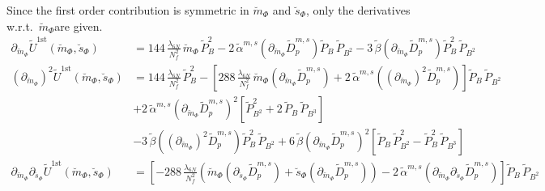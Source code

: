 Since the first order contribution is symmetric in $\breve m_{\Phi}$ and $\breve s_{\Phi}$, only the derivatives w.r.t.\ $\breve m_{\Phi}$are given. 
\begin{align}\label{eq:CEP_derivative_dm_firstOrder_rescaled}
 \partial_{\breve m_{\Phi}} \tilde U^{\text{1st}}(\breve m_{\Phi}, \breve s_{\Phi}) & = 
                           144\,\frac{\lambda_{6N}}{N_f^2}\, \breve m_{\Phi}\, \tilde P_B^2 
                         - 2\,\tilde \alpha^{m,s}\left( \partial_{\breve m_{\Phi}} \tilde D_p^{m,s} \right) \tilde P_B\, \tilde P_{B^2}
                         - 3\, \tilde \beta \left( \partial_{\breve m_{\Phi}} \tilde D_p^{m,s} \right) \tilde P_B^2\,  \tilde P_{B^2}
%                          
       \\ \label{eq:CEP_derivative_dmdm_firstOrder_rescaled}
 \left(\partial_{\breve m_{\Phi}}\right)^2 \tilde U^{\text{1st}}(\breve m_{\Phi}, \breve s_{\Phi}) & = 
                           144\,\frac{\lambda_{6N}}{N_f^2}\, \tilde P_B^2 -
                           \left[ 288\,\frac{\lambda_{6N}}{N_f^2}\,\breve m_{\Phi}\left( \partial_{\breve m_{\Phi}} \tilde D_p^{m,s} \right) 
                         + 2\,\tilde \alpha^{m,s}\left( \left(\partial_{\breve m_{\Phi}}\right)^2 \tilde D_p^{m,s} \right) \right] \tilde P_B\, \tilde P_{B^2}
       \nonumber \\
                       & + 2\,\tilde \alpha^{m,s}\left( \partial_{\breve m_{\Phi}} \tilde D_p^{m,s} \right)^2 \left[ \tilde P_{B^2}^2 + 2\, \tilde P_B\, \tilde P_{B^3} \right]
       \nonumber \\
                       & - 3\, \tilde \beta \left( \left(\partial_{\breve m_{\Phi}}\right)^2 \tilde D_p^{m,s} \right) \tilde P_B^2\,  \tilde P_{B^2}
                         + 6\, \tilde \beta \left( \partial_{\breve m_{\Phi}} \tilde D_p^{m,s} \right)^2 
                         \left[ \tilde P_B\,  \tilde P_{B^2}^2 - \tilde P_B^2\,  \tilde P_{B^3} \right]
%                          
      \\ \label{eq:CEP_derivative_dmds_firstOrder_rescaled}
 \partial_{\breve m_{\Phi}}\partial_{\breve s_{\Phi}}\tilde U^{\text{1st}}(\breve m_{\Phi}, \breve s_{\Phi}) & =
                         \left[- 288\,\frac{\lambda_{6N}}{N_f^2}\left( \breve m_{\Phi} \left( \partial_{\breve s_{\Phi}} \tilde D_p^{m,s} \right) + \breve s_{\Phi} \left( \partial_{\breve m_{\Phi}} \tilde D_p^{m,s} \right) \right)
                         - 2\,\tilde \alpha^{m,s} \left( \partial_{\breve m_{\Phi}} \partial_{\breve s_{\Phi}} \tilde D_p^{m,s} \right) \right] \tilde P_B\, \tilde P_{B^2}

\end{align}
